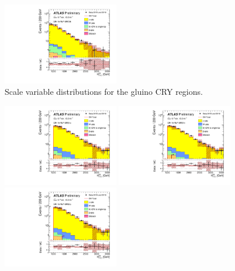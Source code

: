 \begin{figure}[tbp]
\begin{center}
\includegraphics[width=0.45\textwidth]{figures/ATLAS-CONF-2016-078_INT/N-1Plots/AtlasStyle/Preliminary/CRY_SRJigsawSRG3b_LastCut_CRY_minusone}
\end{center}
\caption{Scale variable distributions for the gluino CRY regions.}
\label{fig:CRY_SRJigsawSRG1a_LastCut_CRY_minusone}
\end{figure}

\clearpage
\begin{figure}[tbp]
\begin{center}
\includegraphics[width=0.45\textwidth]{figures/ATLAS-CONF-2016-078_INT/N-1Plots/AtlasStyle/Preliminary/CRY_SRJigsawSRS1a_LastCut_CRY_minusone}
\includegraphics[width=0.45\textwidth]{figures/ATLAS-CONF-2016-078_INT/N-1Plots/AtlasStyle/Preliminary/CRY_SRJigsawSRS1b_LastCut_CRY_minusone}
\includegraphics[width=0.45\textwidth]{figures/ATLAS-CONF-2016-078_INT/N-1Plots/AtlasStyle/Preliminary/CRY_SRJigsawSRS2a_LastCut_CRY_minusone}

\end{center}
\end{figure}
